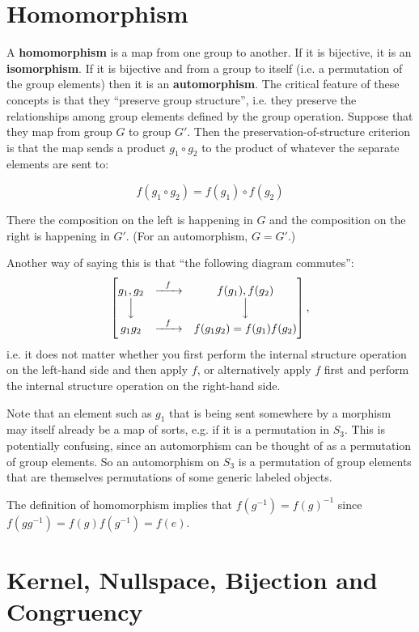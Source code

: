 \newpage
\section{Homomorphism}

A \textbf{homomorphism} is a map from one group to another. If it is bijective,
it is an \textbf{isomorphism}. If it is bijective and from a group to itself
(i.e. a permutation of the group elements) then it is an
\textbf{automorphism}. The critical feature of these concepts is that they
``preserve group structure'', i.e. they preserve the relationships among group
elements defined by the group operation. Suppose that they map from group $G$
to group $G'$. Then the preservation-of-structure criterion is that the map
sends a product $g_1 \circ g_2$ to the product of whatever the separate
elements are sent to:

$$
f(g_1 \circ g_2) = f(g_1) \circ f(g_2)
$$

There the composition on the left is happening in $G$ and the composition on
the right is happening in $G'$. (For an automorphism, $G=G'$.)

Another way of saying this is that ``the following diagram commutes'':
\begin{align*}
  \begin{bmatrix}g_1, g_2 & \xrightarrow{~~f~~} & f(g_1), f(g_2)\\\Big\downarrow &  & \Big\downarrow\\g_1g_2 & \xrightarrow{~~f~~} & f(g_1g_2) = f(g_1)f(g_2)\\ \end{bmatrix},
\end{align*}
i.e. it does not matter whether you first perform the internal structure operation on the left-hand
side and then apply $f$, or alternatively apply $f$ first and perform the internal structure
operation on the right-hand side.

Note that an element such as $g_1$ that is being sent somewhere by a morphism
may itself already be a map of sorts, e.g. if it is a permutation in
$S_3$. This is potentially confusing, since an automorphism can be thought of
as a permutation of group elements. So an automorphism on $S_3$ is a
permutation of group elements that are themselves permutations of some generic
labeled objects.

The definition of homomorphism implies that $f(g^{-1}) = f(g)^{-1}$ since
$f(gg^{-1}) = f(g)f(g^{-1}) = f(e)$.

\section{Kernel, Nullspace, Bijection and Congruency}

